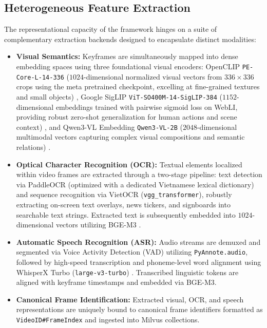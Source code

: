 \subsection{Heterogeneous Feature Extraction}
The representational capacity of the framework hinges on a suite of complementary extraction backends designed to encapsulate distinct modalities:
\begin{itemize}
    \item \textbf{Visual Semantics:} Keyframes are simultaneously mapped into dense embedding spaces using three foundational visual encoders: OpenCLIP \texttt{PE-Core-L-14-336} ($1024$-dimensional normalized visual vectors from $336 \times 336$ crops using the meta pretrained checkpoint, excelling at fine-grained textures and small objects) \cite{radford2021learning, ilharco2021openclip}, Google SigLIP \texttt{ViT-SO400M-14-SigLIP-384} ($1152$-dimensional embeddings trained with pairwise sigmoid loss on WebLI, providing robust zero-shot generalization for human actions and scene context) \cite{zhai2023sigmoid}, and Qwen3-VL Embedding \texttt{Qwen3-VL-2B} ($2048$-dimensional multimodal vectors capturing complex visual compositions and semantic relations) \cite{bai2023qwen}.
    \item \textbf{Optical Character Recognition (OCR):} Textual elements localized within video frames are extracted through a two-stage pipeline: text detection via PaddleOCR (optimized with a dedicated Vietnamese lexical dictionary) \cite{du2020ppocr} and sequence recognition via VietOCR (\texttt{vgg\_transformer}), robustly extracting on-screen text overlays, news tickers, and signboards into searchable text strings. Extracted text is subsequently embedded into $1024$-dimensional vectors utilizing BGE-M3 \cite{chen2024bge}.
    \item \textbf{Automatic Speech Recognition (ASR):} Audio streams are demuxed and segmented via Voice Activity Detection (VAD) utilizing \texttt{PyAnnote.audio}, followed by high-speed transcription and phoneme-level word alignment using WhisperX Turbo (\texttt{large-v3-turbo}) \cite{bainix2023whisperx}. Transcribed linguistic tokens are aligned with keyframe timestamps and embedded via BGE-M3.
    \item \textbf{Canonical Frame Identification:} Extracted visual, OCR, and speech representations are uniquely bound to canonical frame identifiers formatted as \texttt{VideoID\#FrameIndex} and ingested into Milvus collections.
\end{itemize}

